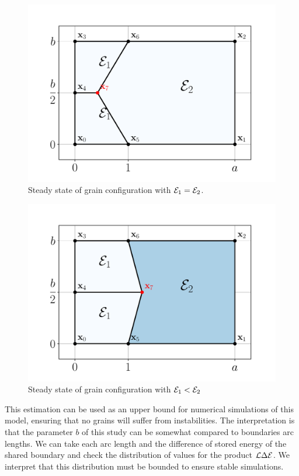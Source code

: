 \begin{figure}
    \centering
    \includegraphics[scale=0.5]{figures/SE_analysis_SE0.pdf}
    \caption{Steady state of grain configuration with $\mathcal{E}_1 = \mathcal{E}_2$.}
    \label{fig:SE_stability_SE0}
\end{figure}

\begin{figure}
    \centering
    \includegraphics[scale=0.5]{figures/SE_analysis_SE1dot5.pdf}
    \caption{Steady state of grain configuration with $\mathcal{E}_1 < \mathcal{E}_2$}
    \label{fig:SE_stability_SE15}
\end{figure}
 
This estimation can be used as an upper bound for numerical simulations of this model, ensuring that no grains will suffer from instabilities. The interpretation is that the parameter $b$ of this study can be somewhat compared to boundaries arc lengths. We can take each arc length and the difference of stored energy of the shared boundary and check the distribution of values for the product $\mathcal{L} \Delta \mathcal{E}$. We interpret that this distribution must be bounded to ensure stable simulations.

